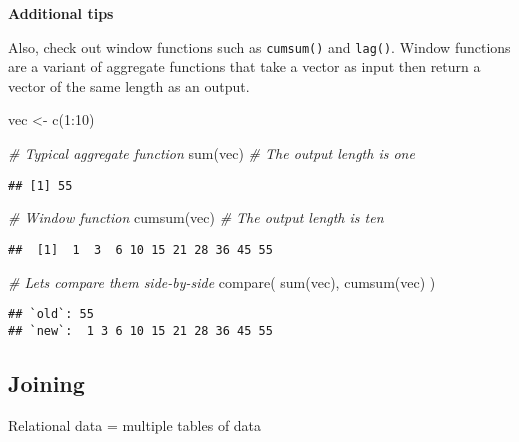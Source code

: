 \documentclass[
]{book}
\newenvironment{Shaded}{\begin{snugshade}}{\end{snugshade}}
\newcommand{\CommentTok}[1]{\textcolor[rgb]{0.56,0.35,0.01}{\textit{#1}}}
\newcommand{\DecValTok}[1]{\textcolor[rgb]{0.00,0.00,0.81}{#1}}
\newcommand{\FunctionTok}[1]{\textcolor[rgb]{0.00,0.00,0.00}{#1}}
\newcommand{\NormalTok}[1]{#1}
\newcommand{\OtherTok}[1]{\textcolor[rgb]{0.56,0.35,0.01}{#1}}
\newcommand{\SpecialCharTok}[1]{\textcolor[rgb]{0.00,0.00,0.00}{#1}}
\begin{document}
\textbf{Additional tips}

Also, check out window functions such as \texttt{cumsum()} and \texttt{lag()}. Window functions are a variant of aggregate functions that take a vector as input then return a vector of the same length as an output.

\begin{Shaded}
\begin{Highlighting}[]
\NormalTok{vec }\OtherTok{\textless{}{-}} \FunctionTok{c}\NormalTok{(}\DecValTok{1}\SpecialCharTok{:}\DecValTok{10}\NormalTok{)}

\CommentTok{\# Typical aggregate function}
\FunctionTok{sum}\NormalTok{(vec) }\CommentTok{\# The output length is one}
\end{Highlighting}
\end{Shaded}

\begin{verbatim}
## [1] 55
\end{verbatim}

\begin{Shaded}
\begin{Highlighting}[]
\CommentTok{\# Window function}
\FunctionTok{cumsum}\NormalTok{(vec) }\CommentTok{\# The output length is ten}
\end{Highlighting}
\end{Shaded}

\begin{verbatim}
##  [1]  1  3  6 10 15 21 28 36 45 55
\end{verbatim}

\begin{Shaded}
\begin{Highlighting}[]
\CommentTok{\# Let\textquotesingle{}s compare them side{-}by{-}side}
\FunctionTok{compare}\NormalTok{(}
  \FunctionTok{sum}\NormalTok{(vec),}
  \FunctionTok{cumsum}\NormalTok{(vec)}
\NormalTok{)}
\end{Highlighting}
\end{Shaded}

\begin{verbatim}
## `old`: 55                         
## `new`:  1 3 6 10 15 21 28 36 45 55
\end{verbatim}

\hypertarget{joining}{%
\subsection{Joining}\label{joining}}

Relational data = multiple tables of data
\end{document}
